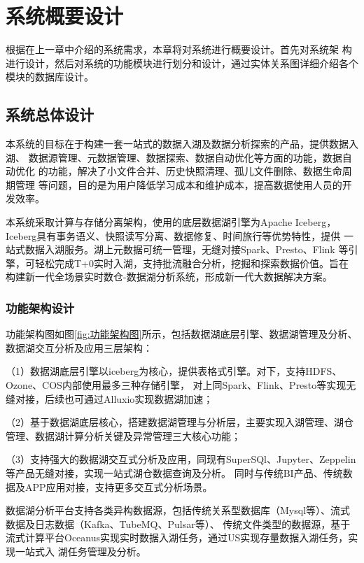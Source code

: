 
\chapter{系统概要设计}

根据在上一章中介绍的系统需求，本章将对系统进行概要设计。首先对系统架
构进行设计，然后对系统的功能模块进行划分和设计，通过实体关系图详细介绍各个模块的数据库设计。

\section{系统总体设计}

本系统的目标在于构建一套一站式的数据入湖及数据分析探索的产品，提供数据入湖、
数据源管理、元数据管理、数据探索、数据自动优化等方面的功能，数据自动优化
的功能，解决了小文件合并、历史快照清理、孤儿文件删除、数据生命周期管理
等问题，目的是为用户降低学习成本和维护成本，提高数据使用人员的开发效率。

本系统采取计算与存储分离架构，使用的底层数据湖引擎为Apache Iceberg，
Iceberg具有事务语义、快照读写分离、数据修复、时间旅行等优势特性，提供
一站式数据入湖服务。湖上元数据可统一管理，无缝对接Spark、Presto、Flink
等引擎，可轻松完成T+0实时入湖，支持批流融合分析，挖掘和探索数据价值。旨在
构建新一代全场景实时数仓-数据湖分析系统，形成新一代大数据解决方案。

\subsection{功能架构设计}

功能架构图如图\ref{fig:功能架构图}所示，包括数据湖底层引擎、数据湖管理及分析、数据湖交互分析及应用三层架构：

（1）数据湖底层引擎以iceberg为核心，提供表格式引擎。对下，支持HDFS、Ozone、COS内部使用最多三种存储引擎，
对上同Spark、Flink、Presto等实现无缝对接，后续也可通过Alluxio实现数据湖加速；

（2）基于数据湖底层核心，搭建数据湖管理与分析层，主要实现入湖管理、湖仓管理、数据湖计算分析关键及异常管理三大核心功能；

（3）支持强大的数据湖交互式分析及应用，同现有SuperSQl、Jupyter、Zeppelin等产品无缝对接，实现一站式湖仓数据查询及分析。
同时与传统BI产品、传统数据及APP应用对接，支持更多交互式分析场景。

数据湖分析平台支持各类异构数据源，包括传统关系型数据库（Mysql等）、流式数据及日志数据（Kafka、TubeMQ、Pulsar等）、
传统文件类型的数据源，基于流式计算平台Oceanus实现实时数据入湖任务，通过US实现存量数据入湖任务，实现一站式入
湖任务管理及分析。

